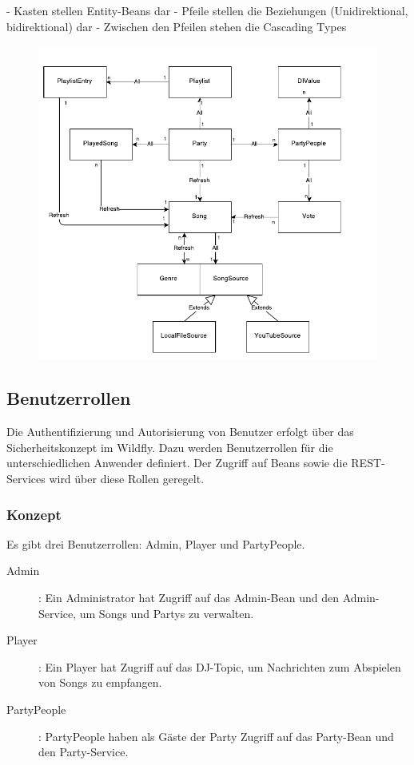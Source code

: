 
- Kasten stellen Entity-Beans dar
- Pfeile stellen die Beziehungen (Unidirektional, bidirektional) dar
- Zwischen den Pfeilen stehen die Cascading Types

\begin{figure}[H]
\centering
\includegraphics[width=1\linewidth]{Bilder/EntityBeansModelMitCascading}
\caption{}
\label{fig:EntityBeansModelMitCascading}
\end{figure}


\subsection{Benutzerrollen}
Die Authentifizierung und Autorisierung von Benutzer erfolgt über das Sicherheitskonzept im Wildfly. Dazu werden Benutzerrollen für die unterschiedlichen Anwender definiert. Der Zugriff auf Beans sowie die REST-Services wird über diese Rollen geregelt. 

\subsubsection{Konzept}
Es gibt drei Benutzerrollen: Admin, Player und PartyPeople.
\begin{description}
	\item[Admin]: Ein Administrator hat Zugriff auf das Admin-Bean und den Admin-Service, um Songs und Partys zu verwalten.
	\item[Player]: Ein Player hat Zugriff auf das DJ-Topic, um Nachrichten zum Abspielen von Songs zu empfangen.
	\item[PartyPeople]: PartyPeople haben als Gäste der Party Zugriff auf das Party-Bean und den Party-Service.
\end{description}

